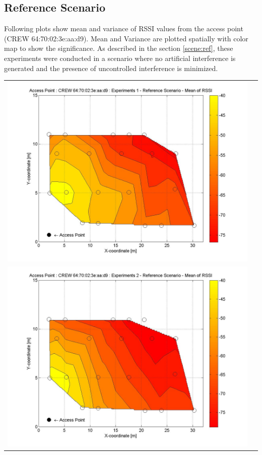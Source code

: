 \documentclass[11pt,a4paper,headinclude,footinclude,chapterprefix=on]{scrreprt}
\begin{document}
\subsection{Reference Scenario} 
Following plots show mean and variance of RSSI values from the access point (CREW 64:70:02:3e:aa:d9). Mean and Variance are plotted spatially with color map to show the significance. As described in the section \ref{scene:ref}, these experiments were conducted in a scenario where no artificial interference is generated and the presence of uncontrolled interference is minimized.
\begin{longtable}
	{lr} 
	\includegraphics[width=13cm]{../../Source/plot/CREW_d9/d9_Ref_Ex_1_Mean.jpg} \\
	\includegraphics[width=13cm]{../../Source/plot/CREW_d9/d9_Ref_Ex_2_Mean.jpg} \\

\end{longtable}
\end{document}
